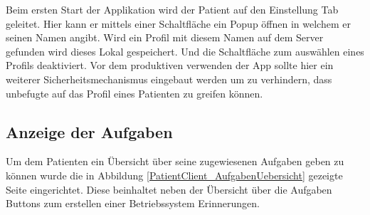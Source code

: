 Beim ersten Start der Applikation wird der Patient auf den Einstellung Tab geleitet. Hier kann er mittels einer Schaltfläche ein Popup öffnen in welchem er seinen Namen angibt. Wird ein Profil mit diesem Namen auf dem Server gefunden wird dieses Lokal gespeichert. Und die Schaltfläche zum auswählen eines Profils deaktiviert.
Vor dem produktiven verwenden der App sollte hier ein weiterer Sicherheitsmechanismus eingebaut werden um zu verhindern, dass unbefugte auf das Profil eines Patienten zu greifen können. 
\subsection{Anzeige der Aufgaben}\label{_ImpPCAufgaben}
Um dem Patienten ein Übersicht über seine zugewiesenen Aufgaben geben zu können wurde die in Abbildung \ref{PatientClient_AufgabenUebersicht} gezeigte Seite eingerichtet. Diese beinhaltet neben der Übersicht über die Aufgaben Buttons zum erstellen einer Betriebssystem Erinnerungen. 

